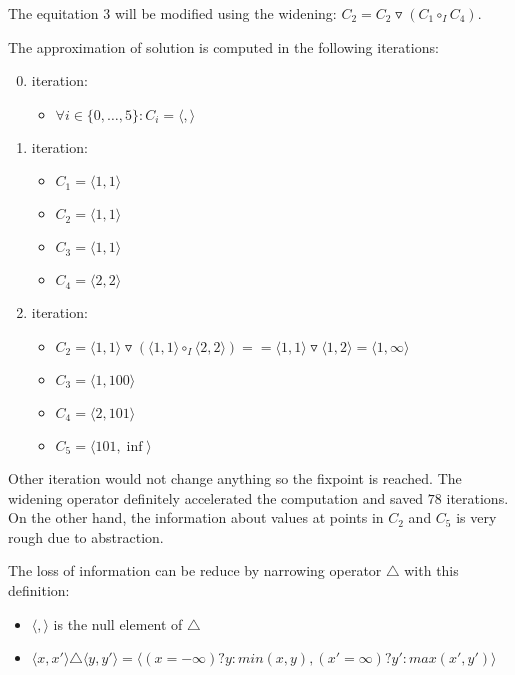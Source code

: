 \documentclass[a4paper, 12pt]{article}
\newcommand{\interval}[2]{\langle #1,#2 \rangle}
\newcommand{\ajoin}[0]{\circ}
\newcommand{\wid}[0]{\triangledown}
\newcommand{\nar}[0]{\triangle}
\newcommand{\iintg}[0]{I}
\newcommand{\ijoin}[0]{\ajoin_\iintg}
\begin{document}
The equitation $3$ will be modified using the widening:
$C_2 = C_2 \wid (C_1 \ijoin C_4)$.

The approximation of solution is computed in the following iterations:
\begin{enumerate}
	\setcounter{enumi}{-1}
	\item \hspace{-0.5em} iteration:
		\begin{itemize}
			\item $\forall i \in \{0,\ldots,5\}: C_i = \interval{}{}$
		\end{itemize}
	
	\item \hspace{-0.5em} iteration:
		\begin{itemize}
			\item $C_1 = \interval{1}{1}$
			\item $C_2 = \interval{1}{1}$
			\item $C_3 = \interval{1}{1}$
			\item $C_4 = \interval{2}{2}$
		\end{itemize}
	
	\item \hspace{-0.5em} iteration:
		\begin{itemize}
			\item $C_2 = \interval{1}{1} \wid (\interval{1}{1} \ijoin \interval{2}{2}) =
		               = \interval{1}{1} \wid \interval{1}{2} = \interval{1}{\infty}$
			\item $C_3 = \interval{1}{100}$
			\item $C_4 = \interval{2}{101}$
			\item $C_5 = \interval{101}{\inf}$
		\end{itemize}
\end{enumerate}

Other iteration would not change anything so the fixpoint is reached.
The widening operator definitely accelerated the computation and
saved $78$ iterations.
On the other hand, the information about values at points in $C_2$ and $C_5$
is very rough due to abstraction.

The loss of information can be reduce by narrowing operator $\nar$ with
this definition:
\begin{itemize}
	\item $\interval{}{}$ is the null element of $\nar$
	\item $\interval{x}{x'} \nar \interval{y}{y'} =
		\interval{(x = -\infty) ? y : min(x,y)}{(x' = \infty) ? y' : max(x',y')}$
\end{itemize}
\end{document}
